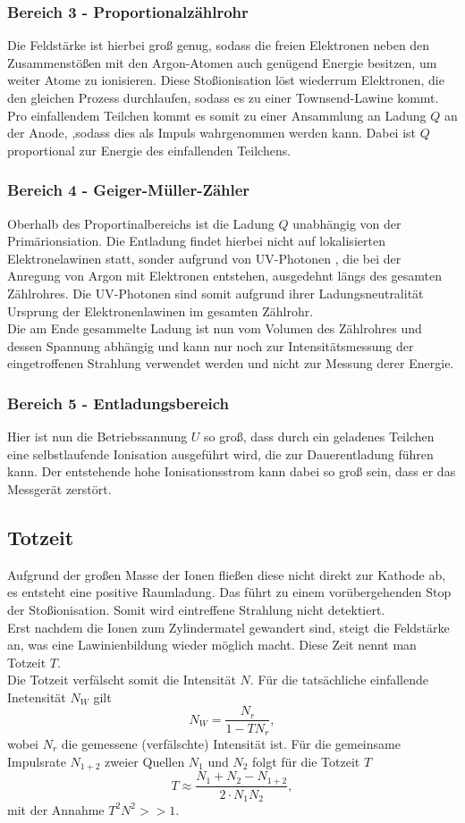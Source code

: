 \subsubsection*{Bereich 3 - Proportionalzählrohr}
Die Feldstärke ist hierbei groß genug, sodass die freien Elektronen neben den Zusammenstößen
mit den Argon-Atomen auch genügend Energie besitzen, um weiter Atome zu ionisieren. Diese 
Stoßionisation löst wiederrum Elektronen, die den gleichen Prozess durchlaufen, sodass es zu einer Townsend-Lawine
kommt. Pro einfallendem Teilchen kommt es somit zu einer Ansammlung an Ladung $Q$ an der Anode,
,sodass dies als Impuls wahrgenommen werden kann. Dabei ist $Q$ proportional zur
Energie des einfallenden Teilchens.
\subsubsection*{Bereich 4 - Geiger-Müller-Zähler}
Oberhalb des Proportinalbereichs ist die Ladung $Q$ unabhängig von der
Primärionsiation. Die Entladung findet hierbei nicht auf lokalisierten Elektronelawinen statt,
sonder aufgrund von UV-Photonen , die bei der Anregung von Argon mit Elektronen entstehen,
ausgedehnt längs des gesamten Zählrohres. Die UV-Photonen sind somit aufgrund ihrer Ladungsneutralität
Ursprung der Elektronenlawinen im gesamten Zählrohr.\\
Die am Ende gesammelte Ladung ist nun vom Volumen des Zählrohres und dessen Spannung abhängig und kann
nur noch zur Intensitätsmessung der eingetroffenen Strahlung verwendet werden und nicht zur Messung derer
Energie.
\subsubsection*{Bereich 5 - Entladungsbereich}
Hier ist nun die Betriebssannung $U$ so groß, dass durch ein geladenes Teilchen eine
selbstlaufende Ionisation ausgeführt wird, die zur Dauerentladung führen kann.
Der entstehende hohe Ionisationsstrom kann dabei so groß sein, dass er das
Messgerät zerstört.
\subsection{Totzeit}
Aufgrund der großen Masse der Ionen fließen diese nicht direkt zur Kathode ab, es 
entsteht eine positive Raumladung. Das führt zu einem vorübergehenden Stop der Stoßionisation.
Somit wird eintreffene Strahlung nicht detektiert.\\
Erst nachdem die Ionen zum Zylindermatel gewandert sind, steigt die Feldstärke 
an, was eine Lawinienbildung wieder möglich macht. Diese Zeit nennt man Totzeit $T$.
\\Die Totzeit verfälscht somit die Intensität $N$. Für die tatsächliche einfallende Inetensität $N_W$
gilt
\begin{equation}
    N_W=\frac{N_r}{1-TN_r},
\end{equation}
wobei $N_r$ die gemessene (verfälschte) Intensität ist.
Für die gemeinsame Impulsrate $N_{1+2}$ zweier Quellen $N_1$ und $N_2$ folgt für
die Totzeit $T$
\begin{equation}
    T \approx \frac{N_1+N_2-N_{1+2}}{2\cdot N_1N_2},
    \label{eqn:2Quellen}
\end{equation}
mit der Annahme $T^2N^2>>1$.
